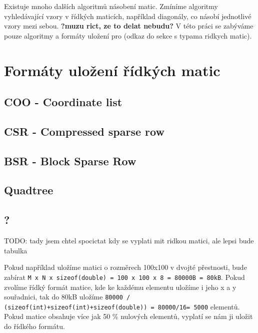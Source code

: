 \documentclass[thesis=B,czech]{FITthesis}[2012/06/26]
\begin{document}
Existuje mnoho dalších algoritmů násobení matic. Zmíníme algoritmy vyhledávající vzory v řídkých maticích, například diagonály, co násobí jednotlivé vzory mezi sebou. \textbf{?muzu rict, ze to delat nebudu?} V této práci se zabýváme pouze algoritmy a formáty uložení pro (odkaz do sekce s typama ridkych matic).



\chapter{Formáty uložení řídkých matic}

\section{COO - Coordinate list}

\section{CSR - Compressed sparse row}

\section{BSR - Block Sparse Row}

\section{Quadtree}

\section{?}

TODO: tady jsem chtel spocictat kdy  se vyplati mit ridkou matici, ale lepsi bude tabulka

Pokud například uložíme matici o rozměrech 100x100 v dvojté přestnosti, bude zabírat \texttt{M x N x sizeof(double) = 100 x 100 x 8 = 80000B = 80kB}. Pokud zvolíme řídký formát matice, kde ke každému elementu uložíme i jeho x a y souřadnici, tak do 80kB uložíme \texttt{80000 / (sizeof(int)+sizeof(int)+sizeof(double)) = 80000/16= 5000} elementů. Pokud matice obsahuje více jak 50  \% nulových elementů, vyplatí se nám ji uložit do řídkého formátu.
\end{document}
